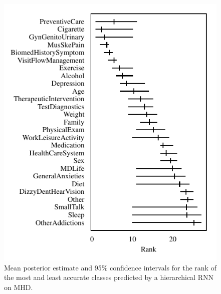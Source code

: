 \documentclass{article}
\begin{document}
\begin{figure}[t]
    \centering
    \includegraphics{figures/mhd_rank.pdf}  
    \caption{
        Mean posterior estimate and 95\% confidence intervals for the rank of the most and least accurate classes predicted by a hierarchical RNN on MHD.
        }
    \label{fig:mhd_rank}
\end{figure}

 
 
\end{document}
